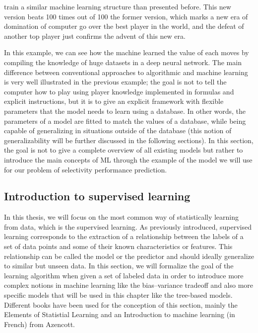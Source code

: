 \documentclass[main]{subfiles}
\begin{document}
train a similar machine learning structure than presented before. This new version beats 100 times out of 100 the former version,\autocite{Silver_2017} which marks a new era of domination of computer go over the best player in the world, and the defeat of another top player just confirms the advent of this new era. 

In this example, we can see how the machine learned the value of each moves by compiling the knowledge of huge datasets in a deep neural network. The main difference between conventional approaches to algorithmic and machine learning is very well illustrated in the previous example; the goal is not to tell the computer how to play using player knowledge implemented in formulas and explicit instructions, but it is to give an explicit framework with flexible parameters that the model needs to learn using a database. In other words, the parameters of a model are fitted to match the values of a database, while being capable of generalizing in situations outside of the database (this notion of generalizability will be further discussed in the following sections). In this section, the goal is not to give a complete overview of all existing models but rather to introduce the main concepts of ML through the example of the model we will use for our problem of selectivity performance prediction.

\subsection{Introduction to supervised learning}

In this thesis, we will focus on the most common way of statistically learning from data, which is the supervised learning. As previously introduced, supervised learning corresponds to the extraction of a relationship between the labels of a set of data points and some of their known characteristics or features. This relationship can be called the model or the predictor and should ideally generalize to similar but unseen data. In this section, we will formalize the goal of the learning algorithm when given a set of labeled data in order to introduce more complex notions in machine learning like the bias--variance tradeoff and also more specific models that will be used in this chapter like the tree-based models. Different books have been used for the conception of this section, mainly the Elements of Statistial Learning\autocite{Hastie_2009} and an Introduction to machine learning (in French) from Azencott\autocite{azencott2022introduction}.
\end{document}

